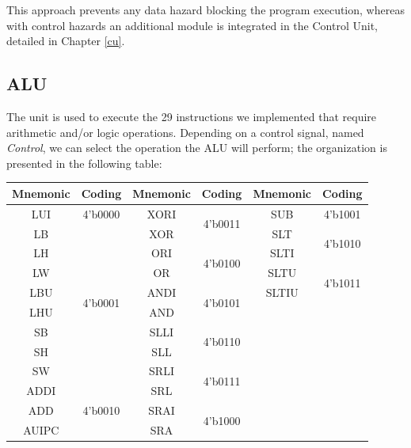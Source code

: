 \documentclass[10pt,  english, makeidx, a4paper, titlepage, oneside]{book}
\begin{document}
This approach prevents any data hazard blocking the program execution, whereas with control hazards an additional module is integrated in the Control Unit, detailed in Chapter \ref{cu}.

\newpage

\subsection{ALU}
The unit is used to execute the 29 instructions we implemented that require arithmetic and/or logic operations. Depending on a control signal, named \textit{Control}, we can select the operation the ALU will perform; the organization is presented in the following table:
\begin{table}[h]
\centering
\begin{tabular}{@{}|cc|cc|cc|@{}}
\hline%
\textbf{Mnemonic} & \textbf{Coding} & \textbf{Mnemonic} & \textbf{Coding} & \textbf{Mnemonic} & \textbf{Coding} \\ \hline%
\multicolumn{1}{|c|}{LUI} & 4'b0000 & \multicolumn{1}{c|}{XORI} & \multirow{2}{*}{4'b0011} & \multicolumn{1}{c|}{SUB} & 4'b1001 \\ \cmidrule(r){1-2} \cmidrule(l){5-6} 
\multicolumn{1}{|c|}{LB} & \multirow{8}{*}{4'b0001} & \multicolumn{1}{c|}{XOR} &  & \multicolumn{1}{c|}{SLT} & \multirow{2}{*}{4'b1010} \\ \cmidrule(lr){3-4}
\multicolumn{1}{|c|}{LH} &  & \multicolumn{1}{c|}{ORI} & \multirow{2}{*}{4'b0100} & \multicolumn{1}{c|}{SLTI} &  \\ \cmidrule(l){5-6} 
\multicolumn{1}{|c|}{LW} &  & \multicolumn{1}{c|}{OR} &  & \multicolumn{1}{c|}{SLTU} & \multirow{2}{*}{4'b1011} \\ \cmidrule(lr){3-4}
\multicolumn{1}{|c|}{LBU} &  & \multicolumn{1}{c|}{ANDI} & \multirow{2}{*}{4'b0101} & \multicolumn{1}{c|}{SLTIU} &  \\ \cmidrule(l){5-6} 
\multicolumn{1}{|c|}{LHU} &  & \multicolumn{1}{c|}{AND} &  &  &  \\ \cmidrule(lr){3-4}
\multicolumn{1}{|c|}{SB} &  & \multicolumn{1}{c|}{SLLI} & \multirow{2}{*}{4'b0110} &  &  \\
\multicolumn{1}{|c|}{SH} &  & \multicolumn{1}{c|}{SLL} &  &  &  \\ \cmidrule(lr){3-4}
\multicolumn{1}{|c|}{SW} &  & \multicolumn{1}{c|}{SRLI} & \multirow{2}{*}{4'b0111} &  &  \\ \cmidrule(r){1-2}
\multicolumn{1}{|c|}{ADDI} & \multirow{3}{*}{4'b0010} & \multicolumn{1}{c|}{SRL} &  &  &  \\ \cmidrule(lr){3-4}
\multicolumn{1}{|c|}{ADD} &  & \multicolumn{1}{c|}{SRAI} & \multirow{2}{*}{4'b1000} &  &  \\
\multicolumn{1}{|c|}{AUIPC} &  & \multicolumn{1}{c|}{SRA} &  &  &  \\ \hline%
\end{tabular}
\end{table}

\end{document}
